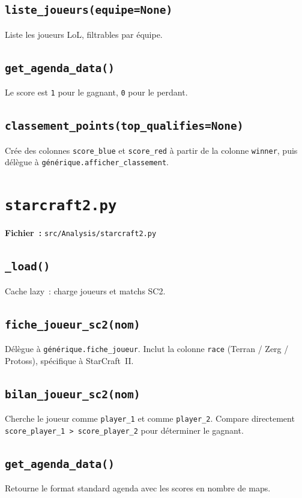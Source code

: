 \documentclass[12pt,a4paper]{article}
\begin{document}
\subsection{\texttt{liste\_joueurs(equipe=None)}}
Liste les joueurs LoL, filtrables par équipe.

\subsection{\texttt{get\_agenda\_data()}}
Le score est \texttt{1} pour le gagnant, \texttt{0} pour le perdant.

\subsection{\texttt{classement\_points(top\_qualifies=None)}}
Crée des colonnes \texttt{score\_blue} et \texttt{score\_red} à partir de la
colonne \texttt{winner}, puis délègue à \texttt{générique.afficher\_classement}.

\section{\texttt{starcraft2.py}}

\textbf{Fichier~:} \texttt{src/Analysis/starcraft2.py}

\subsection{\texttt{\_load()}}
Cache lazy~: charge joueurs et matchs SC2.

\subsection{\texttt{fiche\_joueur\_sc2(nom)}}
Délègue à \texttt{générique.fiche\_joueur}. Inclut la colonne \texttt{race}
(Terran / Zerg / Protoss), spécifique à StarCraft~II.

\subsection{\texttt{bilan\_joueur\_sc2(nom)}}
Cherche le joueur comme \texttt{player\_1} et comme \texttt{player\_2}.
Compare directement \texttt{score\_player\_1 > score\_player\_2} pour
déterminer le gagnant.

\subsection{\texttt{get\_agenda\_data()}}
Retourne le format standard agenda avec les scores en nombre de maps.
\end{document}
